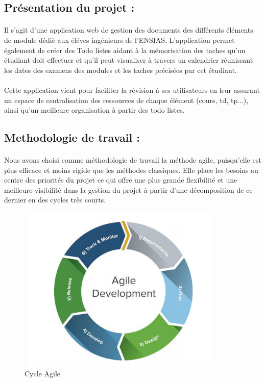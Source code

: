 \documentclass{article}
\begin{document}
{\subsection{Présentation du projet : }
\onehalfspacing\paragraph{}{Il s’agit d'une application web de gestion des documents des différents éléments de module dédié aux éléves ingénieurs de l'ENSIAS. L'application permet également de créer des Todo listes aidant à la mémorisation des taches qu'un étudiant doit effectuer et qu'il peut visualiser à travers un calendrier réunissant les dates des examens des modules et les taches précisées par cet étudiant.
}
\onehalfspacing\paragraph{}{
Cette application vient pour faciliter la révision à ses utilisateurs en leur assurant un espace de centralisation des ressources de chaque élément (cours, td, tp...), ainsi qu'un meilleure organisation à partir des todo listes.   }
\subsection{Methodologie de travail :}
\onehalfspacing\paragraph{}{ Nous avons choisi comme méthodologie de travail la méthode agile, puisqu’elle est
plus efficace et moins rigide que les méthodes classiques. Elle place les besoins au centre des priorités du projet ce qui offre une plus grande flexibilité et une meilleure visibilité dans la
gestion du projet à partir d’une décomposition de ce dernier en des cycles très courts.
}

\begin{figure}[H]
    \center
    \includegraphics[width=10cm,height=8cm]{agile.png}
    \caption{Cycle Agile}
    \label{fig:Cycle Agile.}
\end{figure}

}
\end{document}
